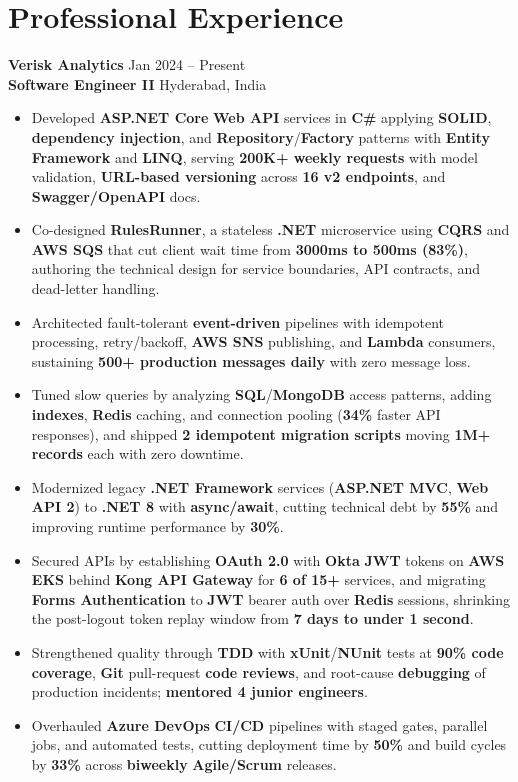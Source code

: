 \documentclass[a4paper,10pt]{article}
\begin{document}
\section*{Professional Experience}

\textbf{Verisk Analytics} \hfill Jan 2024 -- Present \\
\textbf{Software Engineer II} \hfill Hyderabad, India

\begin{itemize}[leftmargin=*]
    \item Developed \textbf{ASP.NET Core} \textbf{Web API} services in \textbf{C\#} applying \textbf{SOLID}, \textbf{dependency injection}, and \textbf{Repository}/\textbf{Factory} patterns with \textbf{Entity Framework} and \textbf{LINQ}, serving \textbf{200K+ weekly requests} with model validation, \textbf{URL-based versioning} across \textbf{16 v2 endpoints}, and \textbf{Swagger/OpenAPI} docs.
    \item Co-designed \textbf{RulesRunner}, a stateless \textbf{.NET} microservice using \textbf{CQRS} and \textbf{AWS SQS} that cut client wait time from \textbf{3000ms to 500ms (83\%)}, authoring the technical design for service boundaries, API contracts, and dead-letter handling.
    \item Architected fault-tolerant \textbf{event-driven} pipelines with idempotent processing, retry/backoff, \textbf{AWS SNS} publishing, and \textbf{Lambda} consumers, sustaining \textbf{500+ production messages daily} with zero message loss.
    \item Tuned slow queries by analyzing \textbf{SQL}/\textbf{MongoDB} access patterns, adding \textbf{indexes}, \textbf{Redis} caching, and connection pooling (\textbf{34\%} faster API responses), and shipped \textbf{2 idempotent migration scripts} moving \textbf{1M+ records} each with zero downtime.
    \item Modernized legacy \textbf{.NET Framework} services (\textbf{ASP.NET MVC}, \textbf{Web API 2}) to \textbf{.NET 8} with \textbf{async/await}, cutting technical debt by \textbf{55\%} and improving runtime performance by \textbf{30\%}.
    \item Secured APIs by establishing \textbf{OAuth 2.0} with \textbf{Okta} \textbf{JWT} tokens on \textbf{AWS EKS} behind \textbf{Kong API Gateway} for \textbf{6 of 15+} services, and migrating \textbf{Forms Authentication} to \textbf{JWT} bearer auth over \textbf{Redis} sessions, shrinking the post-logout token replay window from \textbf{7 days to under 1 second}.
    \item Strengthened quality through \textbf{TDD} with \textbf{xUnit}/\textbf{NUnit} tests at \textbf{90\% code coverage}, \textbf{Git} pull-request \textbf{code reviews}, and root-cause \textbf{debugging} of production incidents; \textbf{mentored 4 junior engineers}.
    \item Overhauled \textbf{Azure DevOps} \textbf{CI/CD} pipelines with staged gates, parallel jobs, and automated tests, cutting deployment time by \textbf{50\%} and build cycles by \textbf{33\%} across \textbf{biweekly} \textbf{Agile/Scrum} releases.
\end{itemize}
\end{document}
